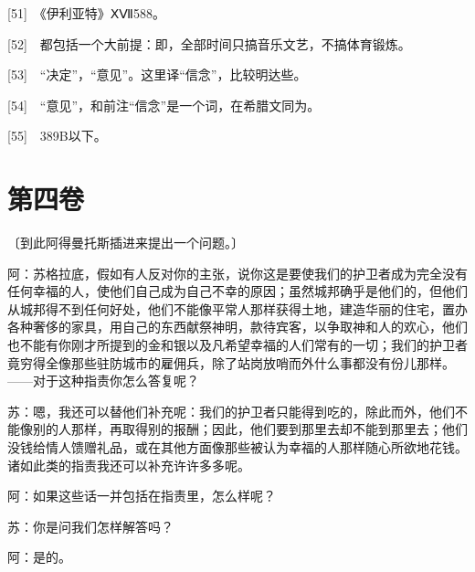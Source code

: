 \documentclass[12pt,oneside]{book}
\begin{document}
[51]　《伊利亚特》ⅩⅦ588。

[52]　都包括一个大前提：即，全部时间只搞音乐文艺，不搞体育锻炼。

[53]　“决定”，“意见”。这里译“信念”，比较明达些。

[54]　“意见”，和前注“信念”是一个词，在希腊文同为。

[55]　389B以下。





\chapter{第四卷}

〔到此阿得曼托斯插进来提出一个问题。〕

阿：苏格拉底，假如有人反对你的主张，说你这是要使我们的护卫者成为完全没有任何幸福的人，使他们自己成为自己不幸的原因；虽然城邦确乎是他们的，但他们从城邦得不到任何好处，他们不能像平常人那样获得土地，建造华丽的住宅，置办各种奢侈的家具，用自己的东西献祭神明，款待宾客，以争取神和人的欢心，他们也不能有你刚才所提到的金和银以及凡希望幸福的人们常有的一切；我们的护卫者竟穷得全像那些驻防城市的雇佣兵，除了站岗放哨而外什么事都没有份儿那样。——对于这种指责你怎么答复呢？

苏：嗯，我还可以替他们补充呢：我们的护卫者只能得到吃的，除此而外，他们不能像别的人那样，再取得别的报酬；因此，他们要到那里去却不能到那里去；他们没钱给情人馈赠礼品，或在其他方面像那些被认为幸福的人那样随心所欲地花钱。诸如此类的指责我还可以补充许许多多呢。

阿：如果这些话一并包括在指责里，怎么样呢？

苏：你是问我们怎样解答吗？

阿：是的。
\end{document}
